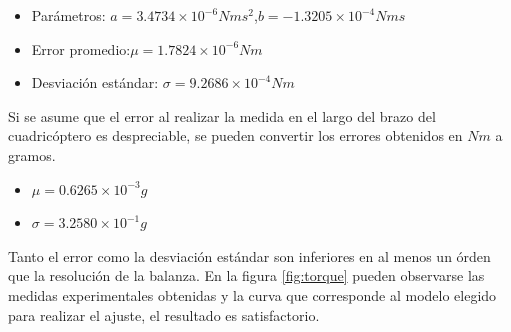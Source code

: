 \documentclass[main]{subfiles}
\begin{document}
\begin{itemize}
 \item Par\'ametros: \newline$a=3.4734\times10^{-6}Nms^2$,\newline$b=-1.3205\times 10 ^{-4} Nms$
\item Error promedio:\newline$\mu = 1.7824\times 10^{-6}Nm$
\item Desviaci\'on est\'andar: \newline$\sigma = 9.2686\times 10^{-4}Nm$ 
\end{itemize}

Si se asume que el error al realizar la medida en el largo del brazo del cuadric\'optero es despreciable, se pueden convertir los errores obtenidos en $Nm$ a gramos.
\begin{itemize}
\item $\mu=0.6265\times10^{-3}g$
\item $\sigma =3.2580\times10^{-1}g$
\end{itemize} 
Tanto el error como la desviaci\'on est\'andar son inferiores en al menos un \'orden que la resoluci\'on de la balanza. En la figura \ref{fig:torque} pueden observarse las medidas experimentales obtenidas y la curva que corresponde al modelo elegido para realizar el ajuste, el resultado es satisfactorio.

%
%
%
\end{document}
